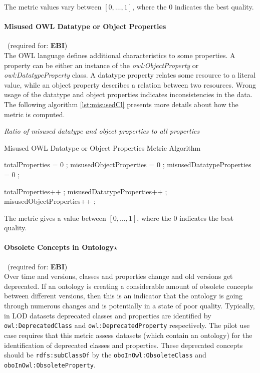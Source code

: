 The metric values vary between  $[0,\ldots,1]$, where  the 0 indicates the best quality.

\paragraph{Misused OWL Datatype or Object Properties}~(required for: \textbf{EBI})~\\
The OWL language defines additional characteristics to some properties. 
A property can be either an instance of the \textit{owl:ObjectProperty} or \textit{owl:DatatypeProperty} class.
A datatype property relates some resource to a literal value, while an object property describes a relation between two resources.
Wrong usage of the datatype and object properties indicates inconsistencies in the data.
The following algorithm  \ref{lst:misusedCl} presents more details about how the metric is computed.

\begin{mdframed}[style=metricdefinition]
\emph{Ratio of misused datatype and object properties to all properties}
\end{mdframed}

\begin{algorithm}
\caption{Misused OWL Datatype or Object Properties Metric Algorithm} \label{lst:misusedCl}
\begin{algorithmic}[1]
\State totalProperties = 0 ;
\State misusedObjectProperties = 0 ;
\State misusedDatatypeProperties = 0 ;
\EndProcedure

 totalProperties++ ;\EndIf 
{} misusedDatatypeProperties++ ; \EndIf 
{} misusedObjectProperties++ ; \EndIf 
\EndProcedure
\end{algorithmic}
\end{algorithm}

The metric gives a value between $[0,\ldots,1]$, where  the 0 indicates the best quality.

\paragraph{Obsolete Concepts in Ontology$\star$}~(required for: \textbf{EBI})~\\
Over time and versions, classes and properties change and old versions get deprecated.
If an ontology is creating a considerable amount of obsolete concepts between different versions, then this is an indicator that the ontology is going through numerous changes and is potentially in a state of poor quality.
Typically, in LOD datasets deprecated classes and properties are identified by \texttt{owl:DeprecatedClass} and \texttt{owl:DeprecatedProperty} respectively.
The pilot use case requires that this metric assess datasets (which contain an ontology) for the identification of deprecated classes and properties.
These deprecated concepts should be \texttt{rdfs:subClassOf} by the \texttt{oboInOwl:ObsoleteClass} and \texttt{oboInOwl:ObsoleteProperty}.

